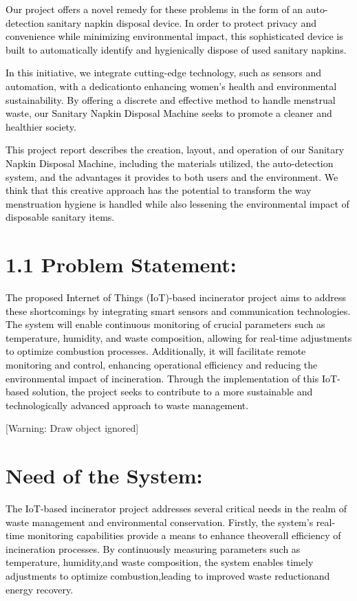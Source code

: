 \documentclass[letterpaper]{article}
\begin{document}
\textcolor{black}{Our project offers a novel remedy for these problems in the form of an auto-detection sanitary napkin
disposal device. In order to protect privacy and convenience while minimizing environmental impact, this sophisticated
device is built to automatically identify and hygienically dispose of used sanitary napkins.}

\textcolor{black}{In this initiative, we integrate cutting-edge technology, such as sensors and automation, with a
dedicationto enhancing women's health and environmental sustainability. By offering a discrete and effective method to
handle menstrual waste, our Sanitary Napkin Disposal Machine seeks to promote a cleaner and healthier society.}

\textcolor{black}{This project report describes the creation, layout, and operation of our Sanitary Napkin Disposal
Machine, including the materials utilized, the auto-detection system, and the advantages it provides to both users and
the environment. We think that this creative approach has the potential to transform the way menstruation hygiene is
handled while also lessening the environmental impact of disposable sanitary items.}


\bigskip

\section[1.1 Problem Statement:]{1.1 Problem Statement:}
\textcolor{black}{The proposed Internet of Things (IoT)-based incinerator project aims to address these shortcomings by
integrating smart sensors and communication technologies. The system will enable continuous monitoring of crucial
parameters such as temperature, humidity, and waste composition, allowing for real-time adjustments to optimize
combustion processes. Additionally, it will facilitate remote monitoring and control, enhancing operational efficiency
and reducing the environmental impact of incineration. Through the implementation of this IoT-based solution, the
project seeks to contribute to a more sustainable and technologically advanced approach to waste management.}

\clearpage\setcounter{page}{1}\pagestyle{Convertedviii}
[Warning: Draw object ignored]

\section[Need of the System:]{Need of the System:}
\textcolor{black}{The IoT-based incinerator project addresses several critical needs in the realm of waste management
and environmental conservation. Firstly, the system's real-time monitoring capabilities provide a means to enhance
theoverall efficiency of incineration processes. By continuously measuring parameters such as temperature, humidity,and
waste composition, the system enables timely adjustments to optimize combustion,leading to improved waste reductionand
energy recovery.}
\end{document}
